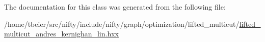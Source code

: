 The documentation for this class was generated from the following file\+:\begin{DoxyCompactItemize}
\item 
/home/tbeier/src/nifty/include/nifty/graph/optimization/lifted\+\_\+multicut/\hyperlink{lifted__multicut__andres__kernighan__lin_8hxx}{lifted\+\_\+multicut\+\_\+andres\+\_\+kernighan\+\_\+lin.\+hxx}\end{DoxyCompactItemize}

